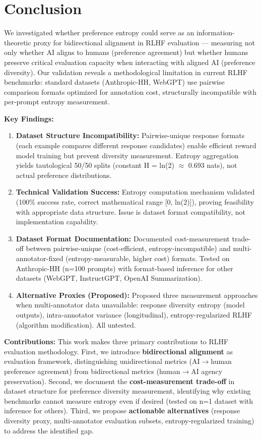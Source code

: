\section{Conclusion}

We investigated whether preference entropy could serve as an information-theoretic proxy for bidirectional alignment in RLHF evaluation — measuring not only whether AI aligns to humans (preference agreement) but whether humans preserve critical evaluation capacity when interacting with aligned AI (preference diversity). Our validation reveals a methodological limitation in current RLHF benchmarks: standard datasets (Anthropic-HH, WebGPT) use pairwise comparison formats optimized for annotation cost, structurally incompatible with per-prompt entropy measurement.

\textbf{Key Findings:}

\begin{enumerate}
\item \textbf{Dataset Structure Incompatibility:} Pairwise-unique response formats (each example compares different response candidates) enable efficient reward model training but prevent diversity measurement. Entropy aggregation yields tautological 50/50 splits (constant H = ln(2) $\approx$ 0.693 nats), not actual preference distributions.

\item \textbf{Technical Validation Success:} Entropy computation mechanism validated (100\% success rate, correct mathematical range [0, ln(2)]), proving feasibility with appropriate data structure. Issue is dataset format compatibility, not implementation capability.

\item \textbf{Dataset Format Documentation:} Documented cost-measurement trade-off between pairwise-unique (cost-efficient, entropy-incompatible) and multi-annotator-fixed (entropy-measurable, higher cost) formats. Tested on Anthropic-HH (n=100 prompts) with format-based inference for other datasets (WebGPT, InstructGPT, OpenAI Summarization).

\item \textbf{Alternative Proxies (Proposed):} Proposed three measurement approaches when multi-annotator data unavailable: response diversity entropy (model outputs), intra-annotator variance (longitudinal), entropy-regularized RLHF (algorithm modification). All untested.
\end{enumerate}

\textbf{Contributions:} This work makes three primary contributions to RLHF evaluation methodology. First, we introduce \textbf{bidirectional alignment} as evaluation framework, distinguishing unidirectional metrics (AI$\rightarrow$human preference agreement) from bidirectional metrics (human$\rightarrow$AI agency preservation). Second, we document the \textbf{cost-measurement trade-off} in dataset structure for preference diversity measurement, identifying why existing benchmarks cannot measure entropy even if desired (tested on n=1 dataset with inference for others). Third, we propose \textbf{actionable alternatives} (response diversity proxy, multi-annotator evaluation subsets, entropy-regularized training) to address the identified gap.

